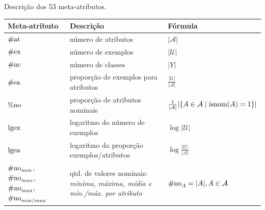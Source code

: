 \begin{quadro}
\centering
\caption{Descrição dos 53 meta-atributos.}
\label{metats}
\begin{threeparttable}
\begin{tabular}{|p{3.6cm}|p{4.6cm}|m{6cm}|}
\hline
\textbf{Meta-atributo} & \textbf{Descrição}&\textbf{Fórmula} \\ \hline
$\operatorname*{\#at}$ & número de atributos\tnote{a} & $|\mathcal{A}|$ \\ \hline
$\operatorname*{\#ex}$ & número de exemplos\tnote{a} & $|\mathcal{U}|$ \\ \hline

$\operatorname*{\#nc}$ & número de classes\tnote{b} & $|Y|$ \\ \hline

$\operatorname*{\#ea}$ & proporção de exemplos para atributos\tnote{c} &
$\frac{|\mathcal{U}|}{|\mathcal{A}|}$
\\ \hline

$\operatorname*{\%no}$ & proporção de atributos nominais\tnote{c} & 
$\frac{1}{|\mathcal{A}|}|\{A\in \mathcal{A} \mid \operatorname*{isnom}(A)=1\}|$ \\ \hline

$\operatorname*{lgex}$ & logaritmo do número de exemplos\tnote{d} &
$\log|\mathcal{U}|$ \\ \hline

$\operatorname*{lgea}$ & logaritmo da proporção exemplos/atributos\tnote{d} &
$\log\frac{|\mathcal{U}|}{|\mathcal{A}|}$ \\ \hline


$\operatorname*{\#no}_{min}$, $\operatorname*{\#no}_{max}$, $\operatorname*{\#no}_{mea}$, $\operatorname*{\#no}_{min/max}$ & 
qtd. de valores nominais:\tnote{c}\phantom{c} 
\textit{mínima, máxima, média e mín./máx. por atributo\tnote{c'}\phantom{c'}} &
$\operatorname*{\#no}_{A} = |A|, A \in \mathcal{A}$ \\ \hline



\end{tabular}
\end{threeparttable}
\end{quadro}
